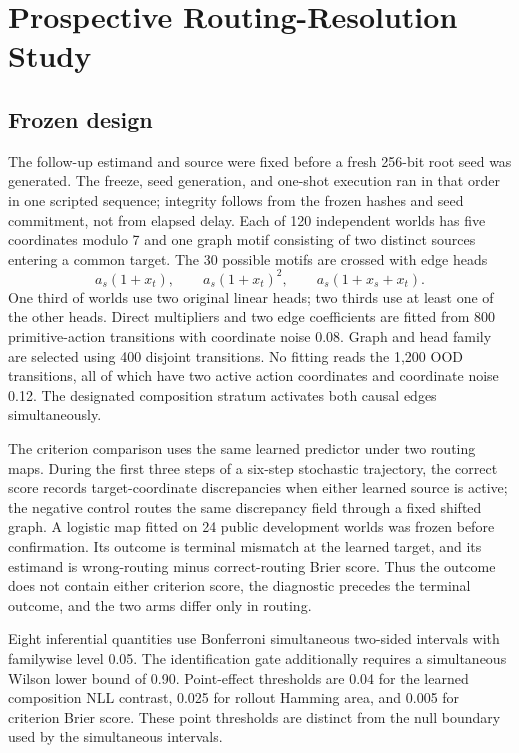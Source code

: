 \section{Prospective Routing-Resolution Study}
\label{sec:routing-resolution}

\subsection{Frozen design}

The follow-up estimand and source were fixed before a fresh 256-bit root seed was
generated.  The freeze, seed generation, and one-shot execution ran in that order
in one scripted sequence; integrity follows from the frozen hashes and seed
commitment, not from elapsed delay.
Each of 120 independent worlds has five coordinates modulo 7 and one graph
motif consisting of two distinct sources entering a common target.  The 30
possible motifs are crossed with edge heads
\[
 a_s(1+x_t),\qquad a_s(1+x_t)^2,\qquad
 a_s(1+x_s+x_t).
\]
One third of worlds use two original linear heads; two thirds use at least one
of the other heads.  Direct multipliers and two edge coefficients are fitted
from 800 primitive-action transitions with coordinate noise 0.08.  Graph and
head family are selected using 400 disjoint transitions.  No fitting reads the
1,200 OOD transitions, all of which have two active action coordinates and
coordinate noise 0.12.  The designated composition stratum activates both
causal edges simultaneously.

The criterion comparison uses the same learned predictor under two routing
maps.  During the first three steps of a six-step stochastic trajectory, the
correct score records target-coordinate discrepancies when either learned
source is active; the negative control routes the same discrepancy field
through a fixed shifted graph.  A logistic map fitted on 24 public development
worlds was frozen before confirmation.  Its outcome is terminal mismatch at
the learned target, and its estimand is wrong-routing minus correct-routing
Brier score.  Thus the outcome does not contain either criterion score, the
diagnostic precedes the terminal outcome, and the two arms differ only in
routing.

Eight inferential quantities use Bonferroni simultaneous two-sided intervals
with familywise level 0.05.  The identification gate additionally requires a
simultaneous Wilson lower bound of 0.90.  Point-effect thresholds are 0.04 for
the learned composition NLL contrast, 0.025 for rollout Hamming area, and 0.005
for criterion Brier score.  These point thresholds are distinct from the null
boundary used by the simultaneous intervals.

